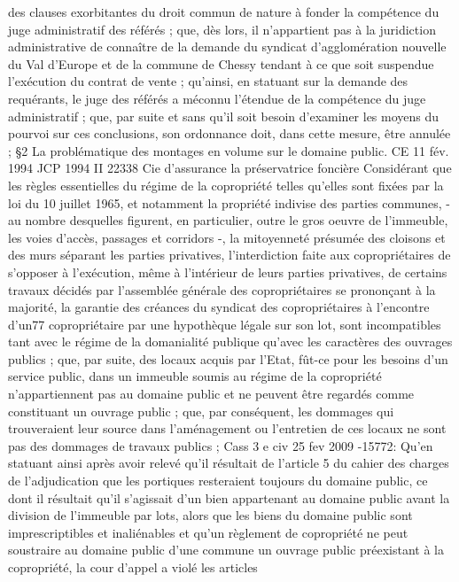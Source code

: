 \documentclass[11pt,a4paper]{report}
\begin{document}
des clauses exorbitantes du droit commun de nature à fonder la compétence du juge administratif des référés ;
que, dès lors, il n'appartient pas à la juridiction administrative de connaître de la demande du syndicat
d'agglomération nouvelle du Val d'Europe et de la commune de Chessy tendant à ce que soit suspendue l'exécution
du contrat de vente ; qu'ainsi, en statuant sur la demande des requérants, le juge des référés a méconnu l'étendue
de la compétence du juge administratif ; que, par suite et sans qu'il soit besoin d'examiner les moyens du pourvoi
sur ces conclusions, son ordonnance doit, dans cette mesure, être annulée ;
§2 La problématique des montages en volume sur le domaine public.
CE 11 fév. 1994 JCP 1994 II 22338 Cie d’assurance la préservatrice foncière
Considérant que les règles essentielles du régime de la copropriété telles qu'elles sont fixées par la loi du 10 juillet
1965, et notamment la propriété indivise des parties communes, - au nombre desquelles figurent, en particulier,
outre le gros oeuvre de l'immeuble, les voies d'accès, passages et corridors -, la mitoyenneté présumée des cloisons
et des murs séparant les parties privatives, l'interdiction faite aux copropriétaires de s'opposer à l'exécution, même
à l'intérieur de leurs parties privatives, de certains travaux décidés par l'assemblée générale des copropriétaires
se prononçant à la majorité, la garantie des créances du syndicat des copropriétaires à l'encontre d'un77
copropriétaire par une hypothèque légale sur son lot, sont incompatibles tant avec le régime de la domanialité
publique qu'avec les caractères des ouvrages publics ; que, par suite, des locaux acquis par l'Etat, fût-ce pour les
besoins d'un service public, dans un immeuble soumis au régime de la copropriété n'appartiennent pas au domaine
public et ne peuvent être regardés comme constituant un ouvrage public ; que, par conséquent, les dommages qui
trouveraient leur source dans l'aménagement ou l'entretien de ces locaux ne sont pas des dommages de travaux
publics ;
Cass 3 e civ 25 fev 2009 -15772: Qu'en statuant ainsi après avoir relevé qu'il résultait de l'article 5 du cahier
des charges de l'adjudication que les portiques resteraient toujours du domaine public, ce dont il résultait qu'il
s'agissait d'un bien appartenant au domaine public avant la division de l'immeuble par lots, alors que les biens du
domaine public sont imprescriptibles et inaliénables et qu'un règlement de copropriété ne peut soustraire au
domaine public d'une commune un ouvrage public préexistant à la copropriété, la cour d'appel a violé les articles
\end{document}
